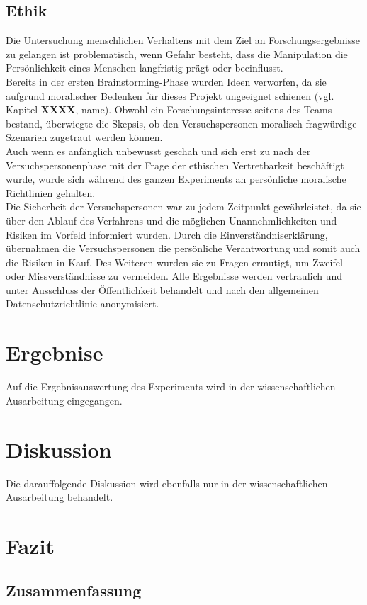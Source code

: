 \documentclass{Bericht}
\begin{document}
\subsection {Ethik}
Die Untersuchung menschlichen Verhaltens mit dem Ziel an Forschungsergebnisse zu gelangen ist problematisch, wenn Gefahr besteht, dass die Manipulation die Persönlichkeit eines Menschen langfristig prägt oder beeinflusst. \\ 
Bereits in der ersten Brainstorming-Phase wurden Ideen verworfen, da sie aufgrund moralischer Bedenken für dieses Projekt ungeeignet schienen (vgl. Kapitel \textbf{XXXX}, name). Obwohl ein Forschungsinteresse seitens des Teams bestand, überwiegte die Skepsis, ob den Versuchspersonen moralisch fragwürdige Szenarien zugetraut werden können. \\
Auch wenn es anfänglich unbewusst geschah und sich erst zu nach der Versuchspersonenphase mit der Frage der ethischen Vertretbarkeit beschäftigt wurde, wurde sich während des ganzen Experiments an persönliche moralische Richtlinien gehalten. \\
Die Sicherheit der Versuchspersonen war zu jedem Zeitpunkt gewährleistet, da sie über den Ablauf des Verfahrens und die möglichen Unannehmlichkeiten und Risiken im Vorfeld informiert wurden. Durch die Einverständniserklärung, übernahmen die Versuchspersonen die persönliche Verantwortung und somit auch die Risiken in Kauf. Des Weiteren wurden sie zu Fragen ermutigt, um Zweifel oder Missverständnisse zu vermeiden. Alle Ergebnisse werden vertraulich und unter Ausschluss der Öffentlichkeit behandelt und nach den allgemeinen Datenschutzrichtlinie anonymisiert. 

\section{Ergebnise}
Auf die Ergebnisauswertung des Experiments wird in der wissenschaftlichen Ausarbeitung eingegangen.
\section{Diskussion}
Die darauffolgende Diskussion wird ebenfalls nur in der wissenschaftlichen Ausarbeitung behandelt.

\section{Fazit}
\subsection{Zusammenfassung}
\end{document}
